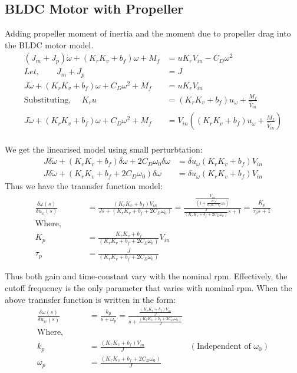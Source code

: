 \subsection{BLDC Motor with Propeller}
Adding propeller moment of inertia and the moment due to propeller drag into the BLDC motor model.
\begin{align*}
    (J_m + J_p) \dot \omega + (K_rK_v + b_f) \omega + M_f &= u K_r V_{in} - C_D \omega^2\\
    Let, \qquad J_m + J_p &= J\\
    J\dot \omega + (K_rK_v + b_f) \omega + C_D \omega^2 + M_f &= u K_r V_{in}\\
    \text{Substituting, } \quad K_r u &= (K_r K_v  + b_f) u_\omega + \frac{M_f}{\hat V_{in}}\\
    J\dot \omega + (K_rK_v + b_f) \omega + C_D \omega^2 + M_f &= V_{in} \left((K_r K_v  + b_f) u_\omega + \frac{M_f}{\hat V_{in}} \right)\\
\end{align*}


We get the linearised model using small perturbtation:
\begin{align*}
     J \delta \dot \omega + (K_r K_v + b_f) \delta \omega + 2 C_D \omega_0 \delta \omega  &= \delta u_\omega (K_r K_v  + b_f)  V_{in}\\
    J \delta \dot \omega + (K_r K_v + b_f + 2 C_D \omega_0) \delta \omega  &=\delta u_\omega (K_r K_v  + b_f)  V_{in}
\end{align*}
Thus we have the trannsfer function model:
\begin{align*}
    \frac{\delta \omega(s)}{\delta u_\omega (s)} &=
    \frac{(K_r K_v  + b_f)  V_{in}}{J s + (K_rK_v + b_f + 2 C_D \omega_0)} = \frac{\frac{V_{in}}{\left(1 + \frac{2 C_D}{K_r K_v + b_f} \omega_0 \right)}}{\frac{J}{(K_r K_v + b_f + 2 C_D \omega_0)}s + 1} = \frac{K_p}{\tau_p s + 1}\\
    \text{Where, }\qquad &\\
    K_p &= \frac{K_r K_v + b_f}{(K_rK_v + b_f + 2 C_D \omega_0)} V_{in}\\
    \tau_p &= \frac{J}{(K_rK_v + b_f + 2 C_D \omega_0)}
\end{align*}

Thus both gain and time-constant vary with the nominal rpm. Effectively, the cutoff frequency is the only parameter that varies with nominal rpm. When the above trannsfer function is written in the form:
\begin{align*}
    \frac{\delta \omega(s)}{\delta u_w(s)} &= \frac{k_p}{s + \omega_p} = \frac{\frac{(K_rK_v + b_f) V_{in}}{J}}{s + \frac{(K_rK_v + b_f + 2 C_D \omega_0)}{J}}\\
    \text{Where, } \qquad &\\
    k_p &= \frac{(K_rK_v + b_f) V_{in}}{J} & (\text{Independent of } \omega_0)\\
    \omega_p &= \frac{(K_rK_v + b_f + 2 C_D \omega_0)}{J}
\end{align*}

